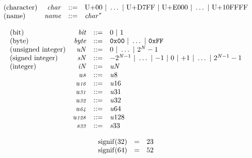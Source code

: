 \vspace{1ex}

$$
\begin{array}{@{}lrrl@{}l@{}}
\mbox{(character)} & {\mathit{char}} &::=& \mathrm{U{+}00} ~|~ \dots ~|~ \mathrm{U{+}D7FF} ~|~ \mathrm{U{+}E000} ~|~ \dots ~|~ \mathrm{U{+}10FFFF} \\
\mbox{(name)} & {\mathit{name}} &::=& {{\mathit{char}}^\ast} \\
\end{array}
$$

\vspace{1ex}

\vspace{1ex}

$$
\begin{array}{@{}lrrl@{}l@{}}
\mbox{(bit)} & {\mathit{bit}} &::=& 0 ~|~ 1 \\
\mbox{(byte)} & {\mathit{byte}} &::=& \mathtt{0x00} ~|~ \dots ~|~ \mathtt{0xFF} \\
\mbox{(unsigned integer)} & {{\mathit{u}}}{{\mathit{N}}} &::=& 0 ~|~ \dots ~|~ {2^{{\mathit{N}}}} - 1 \\
\mbox{(signed integer)} & {{\mathit{s}}}{{\mathit{N}}} &::=& {-{2^{{\mathit{N}} - 1}}} ~|~ \dots ~|~ {-1} ~|~ 0 ~|~ {+1} ~|~ \dots ~|~ {2^{{\mathit{N}} - 1}} - 1 \\
\mbox{(integer)} & {{\mathit{i}}}{{\mathit{N}}} &::=& {{\mathit{u}}}{{\mathit{N}}} \\
& {\mathit{u{\scriptstyle8}}} &::=& {{\mathit{u}}}{8} \\
& {\mathit{u{\scriptstyle16}}} &::=& {{\mathit{u}}}{16} \\
& {\mathit{u{\scriptstyle31}}} &::=& {{\mathit{u}}}{31} \\
& {\mathit{u{\scriptstyle32}}} &::=& {{\mathit{u}}}{32} \\
& {\mathit{u{\scriptstyle64}}} &::=& {{\mathit{u}}}{64} \\
& {\mathit{u{\scriptstyle128}}} &::=& {{\mathit{u}}}{128} \\
& {\mathit{s{\scriptstyle33}}} &::=& {{\mathit{s}}}{33} \\
\end{array}
$$

\vspace{1ex}

$$
\begin{array}{@{}lcl@{}l@{}}
{\mathrm{signif}}(32) &=& 23 &  \\
{\mathrm{signif}}(64) &=& 52 &  \\
\end{array}
$$

